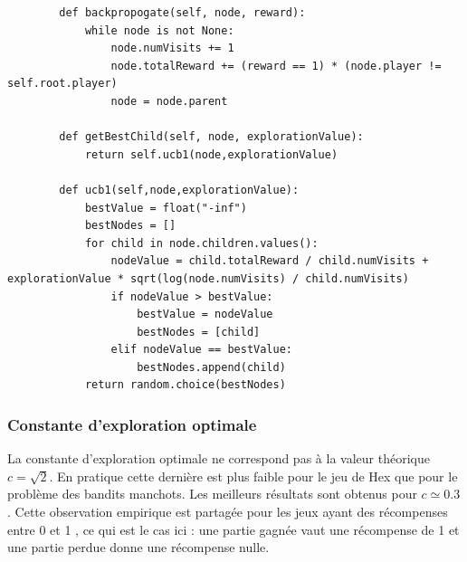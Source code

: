 \documentclass[a4paper]{article}
\theoremstyle{definition}
\begin{document}
\begin{lstlisting}
		def backpropogate(self, node, reward):
			while node is not None:
				node.numVisits += 1
				node.totalReward += (reward == 1) * (node.player != self.root.player)
				node = node.parent
		
		def getBestChild(self, node, explorationValue):
			return self.ucb1(node,explorationValue)
		
		def ucb1(self,node,explorationValue):
			bestValue = float("-inf")
			bestNodes = []
			for child in node.children.values():
				nodeValue = child.totalReward / child.numVisits + explorationValue * sqrt(log(node.numVisits) / child.numVisits)
				if nodeValue > bestValue:
					bestValue = nodeValue
					bestNodes = [child]
				elif nodeValue == bestValue:
					bestNodes.append(child)
			return random.choice(bestNodes)
\end{lstlisting}

\subsubsection{Constante d'exploration optimale}

La constante d'exploration optimale ne correspond pas à la valeur théorique $c=\sqrt{2}$. En pratique cette dernière est plus faible pour le jeu de Hex que pour le problème des bandits manchots. Les meilleurs résultats sont obtenus pour $c \simeq 0.3$. Cette observation empirique est partagée pour les jeux ayant des récompenses entre 0 et 1 \cite{cazenav}, ce qui est le cas ici : une partie gagnée vaut une récompense de 1 et une partie perdue donne une récompense nulle.
\end{document}
